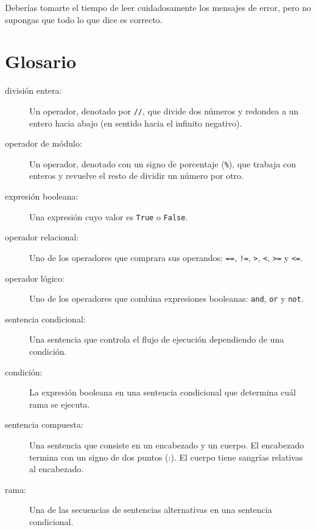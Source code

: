 \documentclass[10pt]{book}
\begin{document}
Deberías tomarte el tiempo de leer cuidadosamente los mensajes de error, pero no
supongas que todo lo que dice es correcto.


\section{Glosario}

\begin{description}

\item[división entera:] Un operador, denotado por {\tt //}, que divide dos
  números y redondea a un entero hacia abajo (en sentido hacia el infinito negativo).

\item[operador de módulo:]  Un operador, denotado con un signo de porcentaje
({\tt \%}), que trabaja con enteros y revuelve el resto de
dividir un número por otro.

\item[expresión booleana:]  Una expresión cuyo valor es
{\tt True} o {\tt False}.

\item[operador relacional:] Uno de los operadores que comprara
sus operandos: {\tt ==}, {\tt !=}, {\tt >}, {\tt <}, {\tt >=} y {\tt <=}.

\item[operador lógico:] Uno de los operadores que combina expresiones
booleanas: {\tt and}, {\tt or} y {\tt not}.

\item[sentencia condicional:]  Una sentencia que controla el flujo de
ejecución dependiendo de una condición.

\item[condición:] La expresión booleana en una sentencia condicional
que determina cuál rama se ejecuta.

\item[sentencia compuesta:]  Una sentencia que consiste en un encabezado
y un cuerpo.  El encabezado termina con un signo de dos puntos (:).  El cuerpo tiene sangrías
relativas al encabezado.

\item[rama:] Una de las secuencias de sentencias alternativas en
una sentencia condicional.


\end{description}
\end{document}
